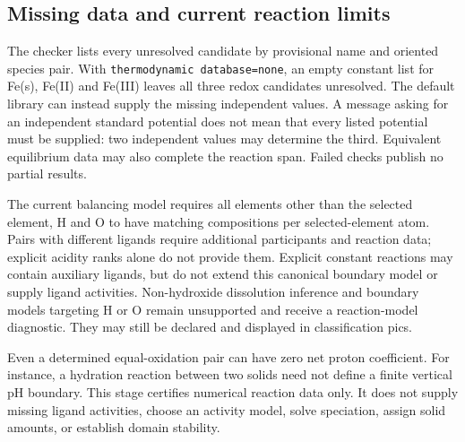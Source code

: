\documentclass[a4paper,11pt]{ltxdoc}
\begin{document}
\subsection{Missing data and current reaction limits}
The checker lists every unresolved candidate by provisional name and oriented
species pair. With \texttt{thermodynamic database=none}, an empty constant list
for Fe(s), Fe(II) and Fe(III) leaves all three redox candidates unresolved.
The default library can instead supply the missing independent values. A message asking for an independent
standard potential does not mean that every listed potential must be supplied:
two independent values may determine the third. Equivalent equilibrium data
may also complete the reaction span. Failed checks publish no partial results.

The current balancing model requires all elements other than the selected
element, H and O to have matching compositions per selected-element atom.
Pairs with different ligands require additional participants and reaction data;
explicit acidity ranks alone do not provide them. Explicit constant reactions
may contain auxiliary ligands, but do not extend this canonical boundary model
or supply ligand activities. Non-hydroxide dissolution inference and boundary
models targeting H or O remain unsupported and receive a reaction-model diagnostic.
They may still be declared and displayed in classification pics.

Even a determined equal-oxidation pair can have zero net proton coefficient.
For instance, a hydration reaction between two solids need not define a finite
vertical pH boundary. This stage certifies numerical reaction data only. It does
not supply missing ligand activities, choose an activity model, solve speciation,
assign solid amounts, or establish domain stability.
\end{document}
